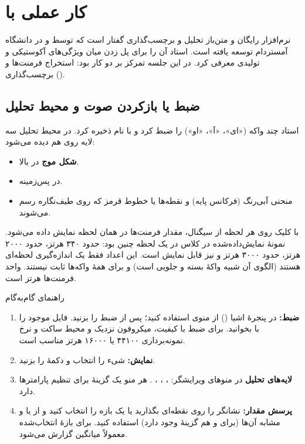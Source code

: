 \section{کار عملی با }
 نرم‌افزار رایگان و متن‌باز تحلیل و برچسب‌گذاری گفتار است که توسط  و  در دانشگاه آمستردام توسعه یافته است. استاد آن را برای پل زدن میان ویژگی‌های آکوستیکی و تولیدی معرفی کرد. در این جلسه تمرکز بر دو کار بود: استخراج فرمنت‌ها و برچسب‌گذاری ().

\subsection{ضبط یا بازکردن صوت و محیط تحلیل}
استاد چند واکه («ای»، «آ»، «او») را ضبط کرد و با نام  ذخیره کرد. در محیط تحلیل  سه لایه روی هم دیده می‌شود:
\begin{itemize}
  \item \textbf{شکل موج} در بالا.
  \item {} در پس‌زمینه.
  \item منحنی آبی‌رنگ  (فرکانس پایه) و نقطه‌ها یا خطوط قرمز  که روی طیف‌نگاره رسم می‌شوند.
\end{itemize}
با کلیک روی هر لحظه از سیگنال، مقدار فرمنت‌ها در همان لحظه نمایش داده می‌شود. نمونهٔ نمایش‌داده‌شده در کلاس در یک لحظه چنین بود:  حدود ۳۴۰ هرتز،  حدود ۲۰۰۰ هرتز،  حدود ۳۰۰۰ هرتز و  نیز قابل نمایش است. این اعداد فقط یک اندازه‌گیری لحظه‌ای هستند (الگوی آن شبیه واکهٔ بسته و جلویی  است) و برای همهٔ واکه‌ها ثابت نیستند. واحد فرمنت‌ها هرتز است.

\begin{addedbox}{راهنمای گام‌به‌گام }
\begin{enumerate}
  \item \textbf{ضبط:} در پنجرهٔ اشیا () از منوی  استفاده کنید؛ پس از ضبط  را بزنید. فایل موجود را با  بخوانید. برای ضبط با کیفیت، میکروفون نزدیک و محیط ساکت و نرخ نمونه‌برداری ۴۴۱۰۰ یا ۱۶۰۰۰ هرتز مناسب است.
  \item \textbf{نمایش:} شیء  را انتخاب و دکمهٔ  را بزنید.
  \item \textbf{لایه‌های تحلیل} در منوهای ویرایشگر: ، ، ، . هر منو یک گزینهٔ  برای تنظیم پارامترها دارد.
  \item \textbf{پرسش مقدار:} نشانگر را روی نقطه‌ای بگذارید یا یک بازه را انتخاب کنید و از  یا  و مشابه آن‌ها (برای  و  هم گزینهٔ  وجود دارد) استفاده کنید. برای بازهٔ انتخاب‌شده معمولاً میانگین گزارش می‌شود.
\end{enumerate}
\end{addedbox}

